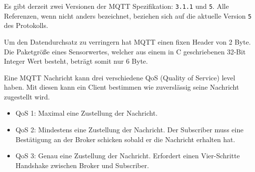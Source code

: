 Es gibt derzeit zwei Versionen der MQTT Spezifikation: \verb|3.1.1| und \verb|5|. Alle Referenzen, wenn nicht anders bezeichnet, beziehen sich auf die aktuelle Version \verb|5| des Protokolls.

Um den Datendurchsatz zu verringern hat MQTT einen fixen Header von 2 Byte. Die Paketgrö{\ss}e eines Sensorwertes, welcher aus einem in C geschriebenen 32-Bit Integer Wert besteht, beträgt somit nur 6 Byte.

Eine MQTT Nachricht kann drei verschiedene QoS (Quality of Service) level haben. Mit diesen kann ein Client bestimmen wie zuverslässig seine Nachricht zugestellt wird.
\begin{itemize}
    \item QoS 1: Maximal eine Zustellung der Nachricht.
    \item QoS 2: Mindestens eine Zustellung der Nachricht. Der Subscriber muss eine Bestätigung an der Broker schicken sobald er die Nachricht erhalten hat.
    \item QoS 3: Genau eine Zustellung der Nachricht. Erfordert einen Vier-Schritte Handshake zwischen Broker und Subscriber.
\end{itemize}

